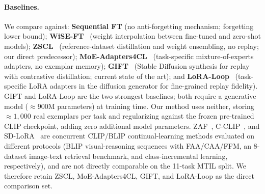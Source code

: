 \documentclass{article}
\let\cite\citep
\begin{document}
  \paragraph{Baselines.}
  We compare against: \textbf{Sequential FT} (no anti-forgetting mechanism;
  forgetting lower bound); \textbf{WiSE-FT}~\cite{wortsman2022wiseft} (weight
  interpolation between fine-tuned and zero-shot models);
  \textbf{ZSCL}~\cite{zheng2023zscl} (reference-dataset distillation and weight
  ensembling, no replay; our direct predecessor);
  \textbf{MoE-Adapters4CL}~\cite{yu2024moe} (task-specific mixture-of-experts
  adapters, no exemplar memory); \textbf{GIFT}~\cite{gift2025} (Stable Diffusion
  synthesis for replay with contrastive distillation; current state of the art);
  and \textbf{LoRA-Loop}~\cite{loraloop2025} (task-specific LoRA adapters in the
  diffusion generator for fine-grained replay fidelity). GIFT and LoRA-Loop are
  the two strongest baselines; both require a generative model
  (${\approx}900$M parameters) at training time. Our method uses neither, storing
  ${\approx}1{,}000$ real exemplars per task and regularizing against the frozen
  pre-trained CLIP checkpoint, adding zero additional model parameters. ZAF~\citep{gao2024zaf}, C-CLIP~\citep{liu2025cclip}, and SD-LoRA~\citep{wu2025sdlora} are concurrent CLIP/BLIP continual-learning methods evaluated on different protocols (BLIP visual-reasoning sequences with FAA/CAA/FFM, an 8-dataset image-text retrieval benchmark, and class-incremental learning, respectively), and are not directly comparable on the 11-task MTIL split. We therefore retain ZSCL, MoE-Adapters4CL, GIFT, and LoRA-Loop as the direct comparison set.

  
\end{document}
